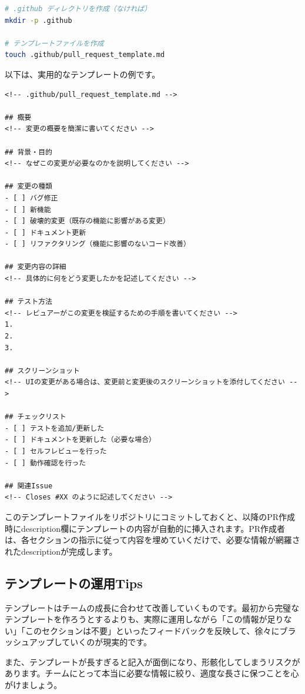 \begin{lstlisting}[language=bash]
# .github ディレクトリを作成（なければ）
mkdir -p .github

# テンプレートファイルを作成
touch .github/pull_request_template.md
\end{lstlisting}

以下は、実用的なテンプレートの例です。

\begin{lstlisting}[language={}]
<!-- .github/pull_request_template.md -->

## 概要
<!-- 変更の概要を簡潔に書いてください -->

## 背景・目的
<!-- なぜこの変更が必要なのかを説明してください -->

## 変更の種類
- [ ] バグ修正
- [ ] 新機能
- [ ] 破壊的変更（既存の機能に影響がある変更）
- [ ] ドキュメント更新
- [ ] リファクタリング（機能に影響のないコード改善）

## 変更内容の詳細
<!-- 具体的に何をどう変更したかを記述してください -->

## テスト方法
<!-- レビュアーがこの変更を検証するための手順を書いてください -->
1.
2.
3.

## スクリーンショット
<!-- UIの変更がある場合は、変更前と変更後のスクリーンショットを添付してください -->

## チェックリスト
- [ ] テストを追加/更新した
- [ ] ドキュメントを更新した（必要な場合）
- [ ] セルフレビューを行った
- [ ] 動作確認を行った

## 関連Issue
<!-- Closes #XX のように記述してください -->
\end{lstlisting}

このテンプレートファイルをリポジトリにコミットしておくと、以降のPR作成時にdescription欄にテンプレートの内容が自動的に挿入されます。PR作成者は、各セクションの指示に従って内容を埋めていくだけで、必要な情報が網羅されたdescriptionが完成します。

\subsection{テンプレートの運用Tips}

テンプレートはチームの成長に合わせて改善していくものです。最初から完璧なテンプレートを作ろうとするよりも、実際に運用しながら「この情報が足りない」「このセクションは不要」といったフィードバックを反映して、徐々にブラッシュアップしていくのが現実的です。

また、テンプレートが長すぎると記入が面倒になり、形骸化してしまうリスクがあります。チームにとって本当に必要な情報に絞り、適度な長さに保つことを心がけましょう。

